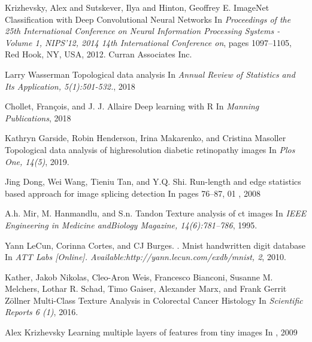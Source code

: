 \documentclass{article}
\begin{document}
\begin{thebibliography}{1}

Krizhevsky, Alex and Sutskever, Ilya and Hinton, Geoffrey E.
\newblock ImageNet Classification with Deep Convolutional Neural Networks
\newblock In {\em Proceedings of the 25th International Conference on Neural Information Processing Systems - Volume 1, NIPS'12, 2014 14th International Conference on}, pages 1097–1105, Red Hook, NY, USA, 2012. Curran Associates Inc.
  
Larry Wasserman
\newblock Topological data analysis
\newblock In {\em Annual Review of Statistics and Its Application, 5(1):501-532.}, 2018

Chollet, François, and J. J. Allaire
\newblock Deep learning with R
\newblock In {\em Manning Publications}, 2018
  
  
Kathryn Garside, Robin Henderson, Irina Makarenko, and Cristina Masoller
\newblock Topological data analysis of highresolution diabetic retinopathy images
\newblock In {\em Plos One, 14(5)}, 2019.
  
Jing Dong, Wei Wang, Tieniu Tan, and Y.Q. Shi.  
\newblock Run-length and edge statistics based approach for image splicing detection
\newblock In {pages 76–87, 01} , 2008

A.h. Mir, M. Hanmandlu, and S.n. Tandon  
\newblock Texture analysis of ct images
\newblock In {\em IEEE Engineering in Medicine andBiology Magazine, 14(6):781–786}, 1995.
  
Yann LeCun, Corinna Cortes, and CJ Burges. .
\newblock Mnist handwritten digit database
\newblock In {\em ATT Labs [Online]. Available:http://yann.lecun.com/exdb/mnist, 2}, 2010.
  
Kather, Jakob Nikolas, Cleo-Aron Weis, Francesco Bianconi, Susanne M. Melchers, Lothar
R. Schad, Timo Gaiser, Alexander Marx, and Frank Gerrit Zöllner
\newblock Multi-Class Texture Analysis in Colorectal Cancer Histology
\newblock In {\em Scientific Reports 6 (1)}, 2016.
  
Alex Krizhevsky
\newblock Learning multiple layers of features from tiny images
\newblock In {}, 2009
  

\end{thebibliography}
\end{document}
